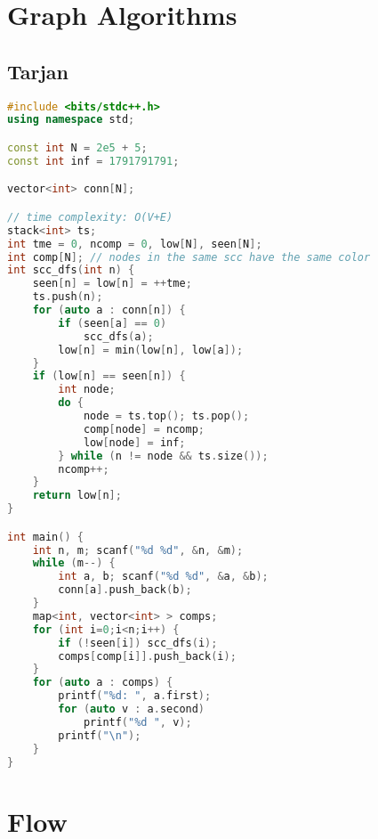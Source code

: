 \documentclass{article}
\begin{document}
\section{Graph Algorithms}
\subsection{Tarjan}
\begin{lstlisting}[language=C++]
#include <bits/stdc++.h>
using namespace std;

const int N = 2e5 + 5;
const int inf = 1791791791;

vector<int> conn[N];

// time complexity: O(V+E)
stack<int> ts;
int tme = 0, ncomp = 0, low[N], seen[N];
int comp[N]; // nodes in the same scc have the same color
int scc_dfs(int n) {
	seen[n] = low[n] = ++tme;
	ts.push(n);
	for (auto a : conn[n]) {
		if (seen[a] == 0)
			scc_dfs(a);
		low[n] = min(low[n], low[a]);
	}
	if (low[n] == seen[n]) {
		int node;
		do {
			node = ts.top(); ts.pop();
			comp[node] = ncomp;
			low[node] = inf;
		} while (n != node && ts.size());
		ncomp++;
	}
	return low[n];
}

int main() {
	int n, m; scanf("%d %d", &n, &m);
	while (m--) {
		int a, b; scanf("%d %d", &a, &b);	
		conn[a].push_back(b);
	}
	map<int, vector<int> > comps;
	for (int i=0;i<n;i++) {
		if (!seen[i]) scc_dfs(i);
		comps[comp[i]].push_back(i);
	}
	for (auto a : comps) {
		printf("%d: ", a.first);
		for (auto v : a.second)
			printf("%d ", v);
		printf("\n");
	}
}
\end{lstlisting}
\section{Flow}
\end{document}
